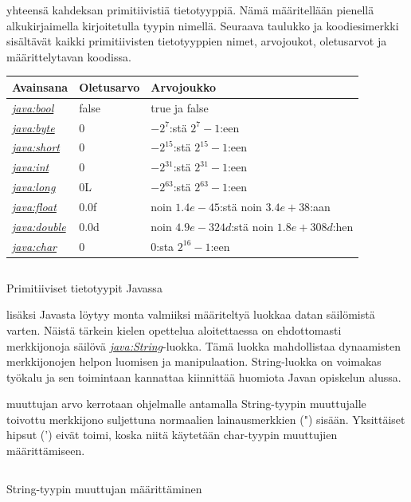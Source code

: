 \documentclass{tufte-book}
\newcommand{\java}[1]{\underline{\gls{java:#1}}}
\newcommand{\newjava}[1]{\textit{\java{#1}}}
\newcommand{\code}[3]{
\begin{listing}
    \inputminted{java}{OhjelmointiopasEsimerkit/src/#1/#2.java}
    \caption{#3}
    \label{Java-#1-#2}
\end{listing}
}
\begin{document}
 yhteensä kahdeksan primitiivistiä tietotyyppiä. Nämä määritellään
pienellä alkukirjaimella kirjoitetulla tyypin nimellä. Seuraava taulukko ja koodiesimerkki
sisältävät kaikki primitiivisten tietotyyppien nimet, arvojoukot, oletusarvot ja määrittelytavan
koodissa.

\bigskip
\begin{center}
\footnotesize
\begin{tabular}{lll}
\toprule
Avainsana & Oletusarvo & Arvojoukko \\
\midrule
\newjava{bool} & false & true ja false \\
\addlinespace
\newjava{byte} & 0 & $-2^7$:stä $2^7-1$:een \\
\addlinespace
\newjava{short} & 0 & $-2^{15}$:stä $2^{15}-1$:een \\
\addlinespace
\newjava{int} & 0 & $-2^{31}$:stä $2^{31}-1$:een \\
\addlinespace
\newjava{long} & 0L & $-2^{63}$:stä $2^{63}-1$:een \\
\addlinespace
\newjava{float} & 0.0f & noin $1.4e-45$:stä noin $3.4e+38$:aan \\
\addlinespace
\newjava{double} & 0.0d & noin $4.9e-324d$:stä noin $1.8e+308d$:hen \\
\addlinespace
\newjava{char} & 0 & $0$:sta $2^{16}-1$:een \\
\bottomrule
\end{tabular}
\end{center}

\code{week2/basicexamples}{DataTypes}{Primitiiviset tietotyypit Javassa}

 lisäksi Javasta löytyy monta valmiiksi määriteltyä luokkaa datan
säilömistä varten. Näistä tärkein kielen opettelua aloitettaessa on ehdottomasti merkkijonoja
säilövä \newjava{String}-luokka. Tämä luokka mahdollistaa dynaamisten merkkijonojen helpon
luomisen ja manipulaation. String-luokka on voimakas työkalu ja sen toimintaan kannattaa
kiinnittää huomiota Javan opiskelun alussa.

 muuttujan arvo kerrotaan ohjelmalle antamalla String-tyypin
muuttujalle toivottu merkkijono suljettuna normaalien lainausmerkkien (") sisään. Yksittäiset 
hipsut (') eivät toimi, koska niitä käytetään char-tyypin muuttujien määrittämiseen.

\code{week2/basicexamples}{StringUsage}{String-tyypin muuttujan määrittäminen}

\end{document}
